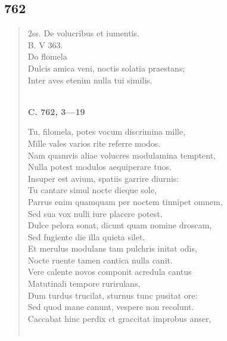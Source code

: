 \documentclass[11pt, a4paper]{report}
\begin{document}
            \subsection*{762}
      \begin{verse}
       \lbrack  2ss. De volucribus et iumentis. \\ B. V 363. \\ Do flomela \\ Dulcis amica veni, noctis solatia praestans; \\ Inter aves etenim nulla tui similis. \\ 
        ﻿\pagebreak 
    \begin{center} \textbf{C. 762, 3—19} \end{center} \marginpar{[4]} Tu, filomela, potes vocum discrimina mille, \\ Mille vales varios rite referre modos. \\ Nam quamvis aliae volucres modulamina temptent, \\ Nulla potest modulos aequiperare tuos. \\ Insuper est avium, spatiis garrire diurnis: \\ Tu cantare simul nocte dieque sole, \\ Parrus enim quamquam per noctem tinnipet omnem, \\ Sed sua vox nulli iure placere potest. \\ Dulce pelora sonat, dicunt quam nomine droscam, \\ Sed fugiente die illa quieta silet. \\ Et merulus modulans tam pulchris initat odis, \\ Nocte ruente tamen cantica nulla canit. \\ Vere calente novos componit acredula cantus \\ Matutinali tempore rurirulans, \\ Dum turdus trucilat, sturnus tunc pusitat ore: \\ Sed quod mane canunt, vespere non recolunt. \\ Caccabat hinc perdix ct graccitat improbus anser, \\ 
        ﻿\pagebreak 

\end{verse}
\end{document}
